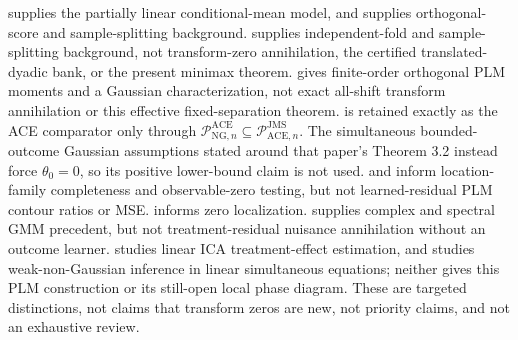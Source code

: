 \cite{Robinson1988} supplies the partially linear conditional-mean model, and \cite{ChernozhukovEtAl2018DML} supplies orthogonal-score and sample-splitting background.  \cite{NeweyRobins2018} supplies independent-fold and sample-splitting background, not transform-zero annihilation, the certified translated-dyadic bank, or the present minimax theorem.  \cite{MackeySyrgkanisZadik2018} gives finite-order orthogonal PLM moments and a Gaussian characterization, not exact all-shift transform annihilation or this effective fixed-separation theorem.  \cite[Theorem 5.4, condition (21), and bound (22)]{JinMackeySyrgkanis2025} is retained exactly as the ACE comparator only through \(\mathcal P_{\mathrm{NG},n}^{\mathrm{ACE}}\subseteq\mathcal P_{\mathrm{ACE},n}^{\mathrm{JMS}}\).  The simultaneous bounded-outcome Gaussian assumptions stated around that paper's Theorem 3.2 instead force \(\theta_0=0\), so its positive lower-bound claim is not used.  \cite{Mattner1992} and \cite{HuShiu2022} inform location-family completeness and observable-zero testing, but not learned-residual PLM contour ratios or MSE.  \cite{DinhGhoshTranTran2021} informs zero localization.  \cite{ChackoViceira2003} supplies complex and spectral GMM precedent, but not treatment-residual nuisance annihilation without an outcome learner.  \cite{ReizingerEtAl2025} studies linear ICA treatment-effect estimation, and \cite{LeeMesters2024} studies weak-non-Gaussian inference in linear simultaneous equations; neither gives this PLM construction or its still-open local phase diagram.  These are targeted distinctions, not claims that transform zeros are new, not priority claims, and not an exhaustive review.